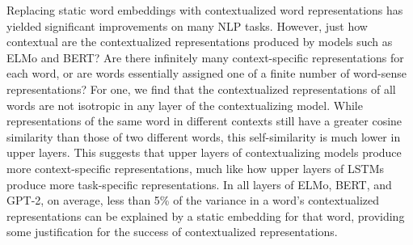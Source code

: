 Replacing static word embeddings with contextualized word representations has yielded significant improvements on many NLP tasks. However, just how contextual are the contextualized representations produced by models such as ELMo and BERT? Are there infinitely many context-specific representations for each word, or are words essentially assigned one of a finite number of word-sense representations? For one, we find that the contextualized representations of all words are not isotropic in any layer of the contextualizing model. While representations of the same word in different contexts still have a greater cosine similarity than those of two different words, this self-similarity is much lower in upper layers. This suggests that upper layers of contextualizing models produce more context-specific representations, much like how upper layers of LSTMs produce more task-specific representations. In all layers of ELMo, BERT, and GPT-2, on average, less than 5\% of the variance in a word's contextualized representations can be explained by a static embedding for that word, providing some justification for the success of contextualized representations.
